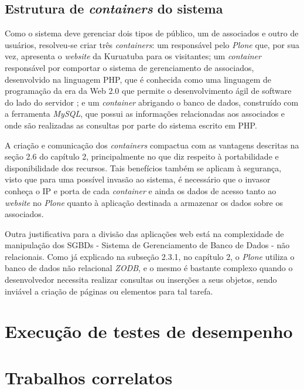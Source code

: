 \subsection{Estrutura de \textit{containers} do sistema}
\label{subsec:docker}
\hspace{2.5cm}

Como o sistema deve gerenciar dois tipos de público, um de associados e outro de usuários, resolveu-se criar três \textit{containers}: um responsável pelo \textit{Plone} que, por sua vez, apresenta o \textit{website} da Kuruatuba para os visitantes; um \textit{container} responsável por comportar o sistema de gerenciamento de associados, desenvolvido na linguagem PHP, que é conhecida como uma linguagem de programação da era da Web 2.0 que permite o desenvolvimento ágil de software do lado do servidor ; e um \textit{container} abrigando o banco de dados, construído com a ferramenta \textit{MySQL}, que possui as informações relacionadas aos associados e onde são realizadas as consultas por parte do sistema escrito em PHP.

A criação e comunicação dos \textit{containers} compactua com as vantagens descritas na seção 2.6 do capítulo 2, principalmente no que diz respeito à portabilidade e disponibilidade dos recursos. Tais benefícios também se aplicam à segurança, visto que para uma possível invasão ao sistema, é necessário que o invasor conheça o IP e porta de cada \textit{container} e ainda os dados de acesso tanto ao \textit{website} no \textit{Plone} quanto à aplicação destinada a armazenar os dados sobre os associados.   

Outra justificativa para a divisão das aplicações web está na complexidade de manipulação dos SGBDs - Sistema de Gerenciamento de Banco de Dados - não relacionais. Como já explicado na subseção 2.3.1, no capítulo 2, o \textit{Plone} utiliza o banco de dados não relacional \textit{ZODB}, e o mesmo é bastante complexo quando o desenvolvedor necessita realizar consultas ou inserções a seus objetos, sendo inviável a criação de páginas ou elementos para tal tarefa.  

\hspace{2.5cm}
\section{Execução de testes de desempenho}
\label{sec:testes}
\hspace{2.5cm}

\hspace{2.5cm}
\section{Trabalhos correlatos}
\hspace{2.5cm}
